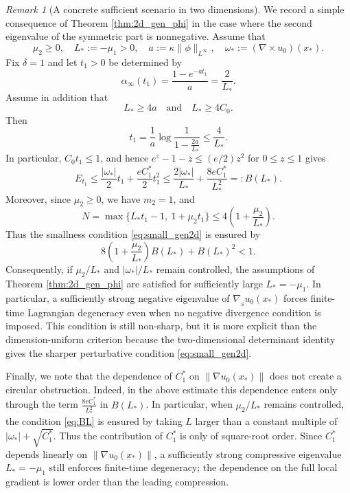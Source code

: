 \documentclass[11pt]{amsart}
\numberwithin{equation}{section}
\theoremstyle{definition}
\theoremstyle{remark}
\newtheorem{remark}[theorem]{Remark}
\numberwithin{equation}{section}
\newtheorem{remark}[theorem]{Remark}
\newcommand{\bq}{\begin{equation}}
\newcommand{\eq}{\end{equation}}
\newcommand{\lt}{\left}
\newcommand{\rt}{\right}
\newcommand{\nabS}{\nabla_{\!\!{}_S}}
\renewcommand{\ge}{\geqslant}
\renewcommand{\le}{\leqslant}
\begin{document}
 
\begin{remark}[A concrete sufficient scenario in two dimensions]
We record a simple consequence of Theorem \ref{thm:2d_gen_phi} in the case where the second eigenvalue of the symmetric part is nonnegative. Assume that
\[
\mu_2\ge0,\quad L_*:=-\mu_1>0,\quad a:=\kappa\|\phi\|_{L^\infty},\quad \omega_*:=(\nabla\times u_0)(x_*).
\]
Fix $\delta=1$ and let $t_1>0$ be determined by
\[
\alpha_\infty(t_1)=\frac{1-e^{-a t_1}}{a}=\frac{2}{L_*}.
\]
Assume in addition that
\[
L_*\ge4a\quad\text{and}\quad L_*\ge4C_0.
\]
Then
\[
t_1=\frac1a\log\frac1{1-\frac{2a}{L_*}}\le\frac{4}{L_*}.
\]
In particular, $C_0t_1\le1$, and hence $e^z-1-z\le(e/2)z^2$ for $0\le z\le1$ gives
\[
E_{t_1}\le \frac{|\omega_*|}{2}t_1+\frac{eC_1^*}{2}t_1^2
\le \frac{2|\omega_*|}{L_*}+\frac{8eC_1^*}{L_*^2}
=:B(L_*).
\]
Moreover, since $\mu_2\ge0$, we have $m_2=1$, and
\[
N=\max\{L_*t_1-1,\ 1+\mu_2t_1\}\le 4\lt(1+\frac{\mu_2}{L_*}\rt).
\]
Thus the smallness condition \eqref{eq:small_gen2d} is ensured by
\bq\label{eq:BL}
8\lt(1+\frac{\mu_2}{L_*}\rt)B(L_*)+B(L_*)^2<1.
\eq
Consequently, if $\mu_2/L_*$ and $|\omega_*|/L_*$ remain controlled, the assumptions of Theorem \ref{thm:2d_gen_phi} are satisfied for sufficiently large $L_*=-\mu_1$. In particular, a sufficiently strong negative eigenvalue of $\nabS u_0(x_*)$ forces finite-time Lagrangian degeneracy even when no negative divergence condition is imposed. This condition is still non-sharp, but it is more explicit than the dimension-uniform criterion because the two-dimensional determinant identity gives the sharper perturbative condition \eqref{eq:small_gen2d}.

Finally, we note that the dependence of $C_1^*$ on $\|\nabla u_0(x_*)\|$ does not create a circular obstruction. Indeed, in the above estimate this dependence enters only through the term $\frac{8eC_1^*}{L_*^2}$ in $B(L_*)$. In particular, when $\mu_2/L_*$ remains controlled, the condition \eqref{eq:BL} is ensured by taking $L$ larger than a constant multiple of $|\omega_*|+\sqrt{C_1^*}$. Thus the contribution of $C_1^*$ is only of square-root order. Since $C_1^*$ depends linearly on $\|\nabla u_0(x_*)\|$, a sufficiently strong compressive eigenvalue $L_*=-\mu_1$ still enforces finite-time degeneracy; the dependence on the full local gradient is lower order than the leading compression.
\end{remark}
 

 
\end{document}
